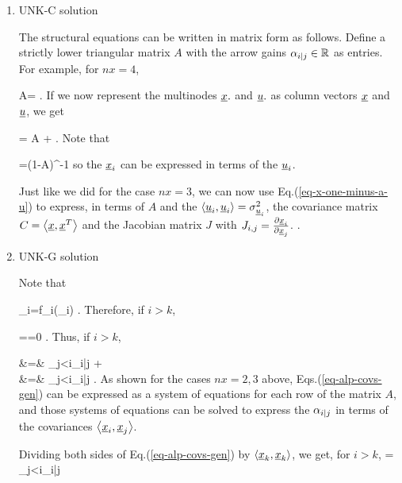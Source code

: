 \begin{enumerate}
\item UNK-C solution

The structural equations can be
written in matrix form
as follows.
Define a strictly lower triangular
matrix $A$
with the arrow gains $\alpha_{i|j}\in { \mathbb{R}}$
as entries.
For example, for $nx=4$,

\beq
A=
\;.
\eeq
If we now represent the multinodes
${\underline{x}}.$ and ${\underline{u}}.$ as column vectors
${\underline{x}}$ and ${\underline{u}}$, we get

\beq
\rvx = A \rvx +\rvu
\label{eq-mat-fully-conn}
\;.
\eeq
Note that

\beq
\rvx=(1-A)^{-1}\rvu
\label{eq-x-one-minus-a-u}
\eeq
so the ${\underline{x}}_i$ can be expressed 
in terms of the ${\underline{u}}_i$. 

Just like we did for the
case $nx=3$, we can now
use Eq.(\ref{eq-x-one-minus-a-u}) to
express,
in terms of $A$ and the $\left\langle{\underline{u}}_i, {\underline{u}}_i\right\rangle=
\sigma^2_{{\underline{u}}_i}$, the covariance
matrix $C=\left\langle{\underline{x}}, {\underline{x}}^T\right\rangle$
and the Jacobian matrix 
$J$ with $J_{i,j}=\frac{\partial{\underline{x}}_i}{\partial{\underline{x}}_j}$.
. 

\item UNK-G solution

Note that

\beq
\rvx_i=f_i(\rvu_{\leq i})
\;.
\eeq
Therefore,
if $i>k$,

\beq
{}
==0
\;.
\eeq
Thus, if $i>k$, 

\beqa
{}&=&
\sum_{j<i}\alp_{i|j}
+
\\
&=&
\sum_{j<i}\alp_{i|j}
\;.
\label{eq-alp-covs-gen}
\eeqa
As shown for the cases $nx=2, 3$
above,
Eqs.(\ref{eq-alp-covs-gen}) can be 
expressed as a system of equations
for each row of the matrix $A$,
and those systems of equations can be 
solved to express the $\alpha_{i|j} $
in terms of the covariances $\left\langle{\underline{x}}_i, {\underline{x}}_j\right\rangle$.

Dividing both sides of 
Eq.(\ref{eq-alp-covs-gen}) by $\left\langle{\underline{x}}_k, {\underline{x}}_k\right\rangle$, we get, for $i>k$,
\beq
{}=
\sum_{j<i}\alp_{i|j}
\label{eq-alp-jacobian-gen}
\eeq


\end{enumerate}

